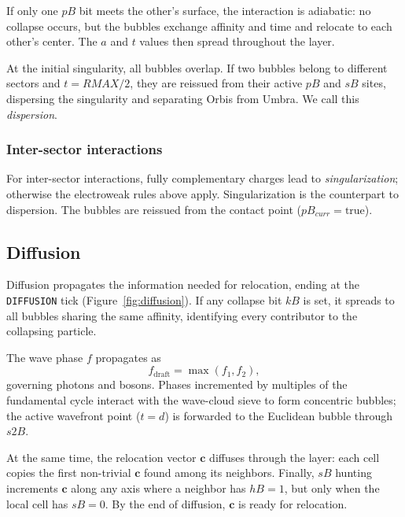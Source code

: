 \documentclass{ijuc}
\begin{document}
If only one $pB$ bit meets the other's surface, the interaction is adiabatic: no collapse occurs, but the bubbles exchange affinity and time and relocate to each other's center. The $a$ and $t$ values then spread throughout the layer.

At the initial singularity, all bubbles overlap. If two bubbles belong to different sectors and $t=RMAX/2$, they are reissued from their active $pB$ and $sB$ sites, dispersing the singularity and separating Orbis from Umbra. We call this \textit{dispersion}.

\subsubsection{Inter-sector interactions}
For inter-sector interactions, fully complementary charges lead to \textit{singularization}; otherwise the electroweak rules above apply. Singularization is the counterpart to dispersion. 
The bubbles are reissued from the contact point ($pB_{curr}=\text{true}$).


\subsection{Diffusion}

Diffusion propagates the information needed for relocation, ending at the \texttt{DIFFUSION} tick (Figure~\ref{fig:diffusion}). If any collapse bit $kB$ is set, it spreads to all bubbles sharing the same affinity, identifying every contributor to the collapsing particle.

The wave phase $f$ propagates as
\[
f_{\text{draft}} = \max(f_1, f_2),
\]
governing photons and bosons. Phases incremented by multiples of the fundamental cycle interact with the wave-cloud sieve to form concentric bubbles; the active wavefront point ($t=d$) is forwarded to the Euclidean bubble through $s2B$.

At the same time, the relocation vector $\mathbf{c}$ diffuses through the layer: each cell copies the first non-trivial $\mathbf{c}$ found among its neighbors. Finally, $sB$ hunting increments $\boldsymbol{c}$ along any axis where a neighbor has $hB=1$, but only when the local cell has $sB=0$. By the end of diffusion, $\boldsymbol{c}$ is ready for relocation.

\end{document}
